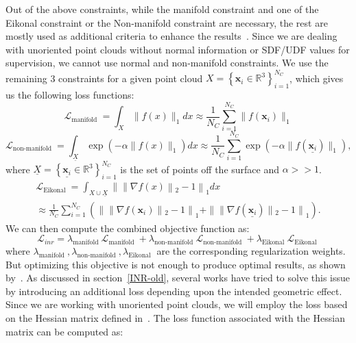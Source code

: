 Out of the above constraints, while the manifold constraint and one of the Eikonal constraint or the Non-manifold constraint are necessary, the rest are mostly used as additional criteria to enhance the results~\cite{DiGS}. Since we are dealing with unoriented point clouds without normal information or SDF/UDF values for supervision, we cannot use normal and non-manifold constraints. We use the remaining 3 constraints for a given point cloud $X=\left\{\mathbf{x}_{i} \in \mathbb{R}^{3}\right\}_{i=1}^{N_C}$, which gives us the following loss functions:
\begin{equation}\label{manifold_sdf}
    \mathcal{L}_{\text {manifold }}=\int_{X}\|f(x)\|_{1} d x \approx \frac{1}{N_C}\sum_{i=1}^{N_C}\|f(\mathbf{x}_i)\|_1
\end{equation}
\begin{equation}\label{non_manifold_sdf}
    \mathcal{L}_{\text {non-manifold }}=\int_{\underline{X}} \exp \left(-\alpha\|f(x)\|_{1}\right) d x \approx \frac{1}{N_C}\sum_{i=1}^{N_C} \exp \left(-\alpha\|f(\underline{\mathbf{x}_i})\|_1\right),
\end{equation}
where $\underline{X}=\left\{\underline{\mathbf{x}_i} \in \mathbb{R}^{3}\right\}_{i=1}^{N_C}$ is the set of points off the surface and $\alpha>>1$.
\begin{equation}\label{Eikonal}
     \begin{aligned}
         \mathcal{L}_{\text {Eikonal }}=\int_{X \cup \underline{X}} \| \| \nabla f(x)\left\|_{2}-1\right\|_{1} d x \\
         \approx \frac{1}{N_C}\sum_{i=1}^{N_C} \left(\| \| \nabla f(\mathbf{x}_i)\left\|_{2}-1\right\|_{1} + \| \| \nabla f(\underline{\mathbf{x}_i})\left\|_{2}-1\right\|_{1} \right).
     \end{aligned}
\end{equation}
We can then compute the combined objective function as:
\begin{equation}\label{inr_loss1}
    \mathcal{L}_{inr}= \lambda_{\text {manifold }} \mathcal{L}_{\text {manifold }}+\lambda_{\text {non-manifold }} \mathcal{L}_{\text {non-manifold }}+ \lambda_{\text {Eikonal }} \mathcal{L}_{\text {Eikonal }}
\end{equation}
where $\lambda_{\text {manifold }}, \lambda_{\text {non-manifold }}, \lambda_{\text {Eikonal }}$ are the corresponding regularization weights. But optimizing this objective is not enough to produce
optimal results, as shown by~\cite{DiGS, NeuralHessian}. As discussed in section~\ref{INR-old}, several works have tried to solve this issue by introducing an additional loss depending upon the intended geometric effect. Since we are working with unoriented point clouds, we will employ the loss based on the Hessian matrix defined in~\cite{NeuralHessian}. The loss function associated with the Hessian matrix can be computed as:

